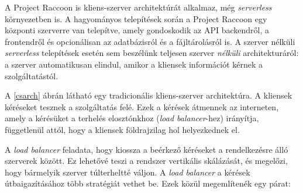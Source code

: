 A Project Raccoon is kliens-szerver architektúrát alkalmaz, még \textit{serverless} környezetben is. A hagyományos telepítések során a Project Raccoon egy központi szerverre van telepítve, amely gondoskodik az API backendről, a frontendről és opcionálisan az adatbázisról és a fájltárolásról is. A szerver nélküli \textit{serverless} telepítések esetén sem beszélünk teljesen szerver \textit{nélküli} architekturáról: a szerver automatikusan elindul, amikor a kliensek információt kérnek a szolgáltatástól.

A \ref{csarch} ábrán látható egy tradicionális kliens-szerver architektúra. A kliensek kéréseket tesznek a szolgáltatás felé. Ezek a kérések átmennek az interneten, amely a kérésüket a terhelés elosztónkhoz (\textit{load balancer}-hez) irányítja, függetlenül attól, hogy a kliensek földrajzilag hol helyezkednek el. 

A \textit{load balancer} feladata, hogy kiossza a beérkező kéréseket a rendelkezésre álló szerverek között. Ez lehetővé teszi a rendszer vertikális skálázását, és megelőzi, hogy bármelyik szerver túlterheltté váljon. A \textit{load balancer} a kérések útbaigazításához több stratégiát vethet be. \cite{loadbalancing} Ezek közül megemlítenék egy párat:

